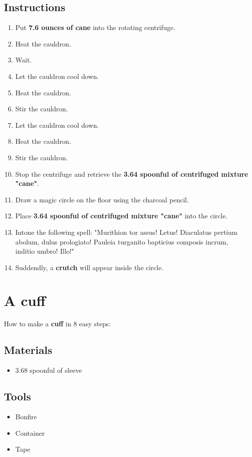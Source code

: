 \documentclass{article}
\begin{document}
\subsection{Instructions}\begin{enumerate}
\item 
Put \textbf{7.6 ounces of cane} into the rotating centrifuge.
\item 
Heat the cauldron.
\item 
Wait.
\item 
Let the cauldron cool down.
\item 
Heat the cauldron.
\item 
Stir the cauldron.
\item 
Let the cauldron cool down.
\item 
Heat the cauldron.
\item 
Stir the cauldron.
\item 
Stop the centrifuge and retrieve the \textbf{3.64 spoonful of centrifuged mixture "cane"}.
\item 
Draw a magic circle on the floor using the charcoal pencil.
\item 
Place \textbf{3.64 spoonful of centrifuged mixture "cane"} into the circle.
\item 
Intone the following spell: "Murithion tor assus! Letus! Diaculatus pertium abolum, dulus prologiato! Pauleia turganito bapticius composis incrum, inditio umbro! Illo!"
\item 
Suddendly, a \textbf{crutch} will appear inside the circle.
\end{enumerate}
\newpage
\section{A cuff}How to make a \textbf{cuff} in 8 easy steps:

\subsection{Materials}\begin{itemize}
\item 
3.68 spoonful of sleeve
\end{itemize}
\subsection{Tools}\begin{itemize}
\item 
Bonfire
\item 
Container
\item 
Tape
\end{itemize}
\end{document}
